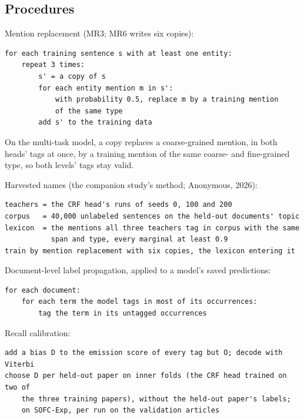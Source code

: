 \documentclass[11pt,a4paper]{article}
\begin{document}
\hypertarget{procedures}{%
\subsection{Procedures}\label{procedures}}

Mention replacement (MR3; MR6 writes six copies):

\begin{Verbatim}[breaklines,breakanywhere,fontsize=\small]
for each training sentence s with at least one entity:
    repeat 3 times:
        s' = a copy of s
        for each entity mention m in s':
            with probability 0.5, replace m by a training mention
            of the same type
        add s' to the training data
\end{Verbatim}

On the multi-task model, a copy replaces a coarse-grained mention, in both
heads' tags at once, by a training mention of the same coarse- and
fine-grained type, so both levels' tags stay valid.

Harvested names (the companion study's method; Anonymous, 2026):

\begin{Verbatim}[breaklines,breakanywhere,fontsize=\small]
teachers = the CRF head's runs of seeds 0, 100 and 200
corpus   = 40,000 unlabeled sentences on the held-out documents' topic
lexicon  = the mentions all three teachers tag in corpus with the same
           span and type, every marginal at least 0.9
train by mention replacement with six copies, the lexicon entering it
\end{Verbatim}

Document-level label propagation, applied to a model's saved predictions:

\begin{Verbatim}[breaklines,breakanywhere,fontsize=\small]
for each document:
    for each term the model tags in most of its occurrences:
        tag the term in its untagged occurrences
\end{Verbatim}

Recall calibration:

\begin{Verbatim}[breaklines,breakanywhere,fontsize=\small]
add a bias D to the emission score of every tag but O; decode with Viterbi
choose D per held-out paper on inner folds (the CRF head trained on two of
    the three training papers), without the held-out paper's labels;
    on SOFC-Exp, per run on the validation articles
\end{Verbatim}
\end{document}

